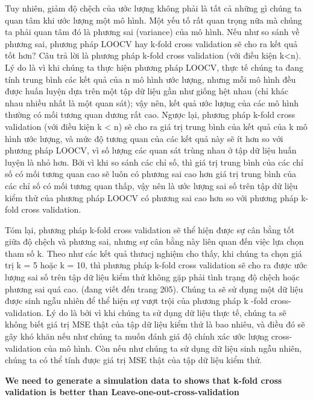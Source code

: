 \documentclass[
]{article}
\begin{document}
Tuy nhiên, giảm độ chệch của ước lượng không phải là tất cả những gì chúng ta quan tâm khi ước lượng một mô hình. Một yếu tố rất quan trọng nữa mà chúng ta phải quan tâm đó là phương sai (variance) của mô hình. Nếu như so sánh về phương sai, phương pháp LOOCV hay k-fold cross validation sẽ cho ra kết quả tốt hơn? Câu trả lời là phương pháp k-fold cross validation (với điều kiện k\textless n). Lý do là vì khi chúng ta thực hiện phương pháp LOOCV, thực tế chúng ta đang tính trung bình các kết quả của n mô hình ước lượng, nhưng mỗi mô hình đều được huấn luyện dựa trên một tập dữ liệu gần như giống hệt nhau (chỉ khác nhau nhiều nhất là một quan sát); vậy nên, kết quả ước lượng của các mô hình thường có mối tương quan dương rất cao. Ngược lại, phương pháp k-fold cross validation (với điều kiện k \textless{} n) sẽ cho ra giá trị trung bình của kết quả của k mô hình ước lượng, và mức độ tương quan của các kết quả này sẽ ít hơn so với phương pháp LOOCV, vì số lượng các quan sát trùng nhau ở tập dữ liệu huấn luyện là nhỏ hơn. Bởi vì khi so sánh các chỉ số, thì giá trị trung bình của các chỉ số có mối tương quan cao sẽ luôn có phương sai cao hơn giá trị trung bình của các chỉ số có mối tương quan thấp, vậy nên là ước lượng sai số trên tập dữ liệu kiểm thử của phương pháp LOOCV có phương sai cao hơn so với phương pháp k-fold cross validation.

Tóm lại, phương pháp k-fold cross validation sẽ thể hiện được sự cân bằng tốt giữa độ chệch và phương sai, nhưng sự cân bằng này liên quan đến việc lựa chọn tham số k. Theo như các kết quả thưucj nghiệm cho thấy, khi chúng ta chọn giá trị k = 5 hoặc k = 10, thì phương pháp k-fold cross validation sẽ cho ra được ước lượng sai số trên tập dữ liệu kiểm thử không gặp phải tình trạng độ chệch hoặc phương sai quá cao.
(đang viết đến trang 205). Chúng ta sẽ sử dụng một dữ liệu được sinh ngẫu nhiên để thể hiện sự vượt trội của phương pháp k -fold cross-validation. Lý do là bởi vì khi chúng ta sử dụng dữ liệu thực tế, chúng ta sẽ không biết giá trị MSE thật của tập dữ liệu kiểm thử là bao nhiêu, và điều đó sẽ gây khó khăn nếu như chúng ta muốn đánh giá độ chính xác ước lượng cross-validation của mô hình. Còn nếu như chúng ta sử dụng dữ liệu sinh ngẫu nhiên, chúng ta có thể tính được giá trị MSE thật của tập dữ liệu kiểm thử.

\textbf{We need to generate a simulation data to shows that k-fold cross validation is better than Leave-one-out-cross-validation}
\end{document}
